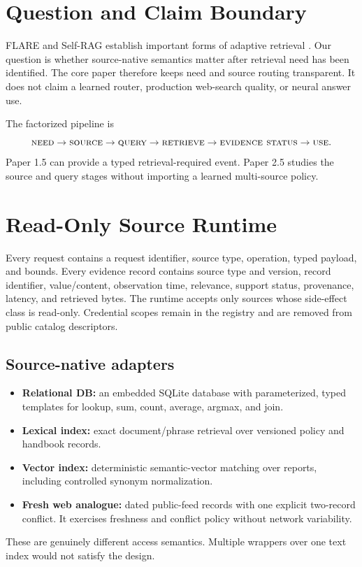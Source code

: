 \documentclass[11pt]{article}
\begin{document}
\section{Question and Claim Boundary}
FLARE and Self-RAG establish important forms of adaptive retrieval
\cite{flare,selfrag}. Our question is whether source-native semantics matter
after retrieval need has been identified. The core paper therefore keeps need
and source routing transparent. It does not claim a learned router, production
web-search quality, or neural answer use.

The factorized pipeline is
\[
\textsc{need}\rightarrow\textsc{source}\rightarrow\textsc{query}
\rightarrow\textsc{retrieve}\rightarrow\textsc{evidence\ status}
\rightarrow\textsc{use}.
\]
Paper 1.5 can provide a typed retrieval-required event. Paper 2.5 studies the
source and query stages without importing a learned multi-source policy.

\section{Read-Only Source Runtime}
Every request contains a request identifier, source type, operation, typed
payload, and bounds. Every evidence record contains source type and version,
record identifier, value/content, observation time, relevance, support status,
provenance, latency, and retrieved bytes. The runtime accepts only sources whose
side-effect class is read-only. Credential scopes remain in the registry and are
removed from public catalog descriptors.

\subsection{Source-native adapters}
\begin{itemize}
\item \textbf{Relational DB:} an embedded SQLite database with parameterized,
typed templates for lookup, sum, count, average, argmax, and join.
\item \textbf{Lexical index:} exact document/phrase retrieval over versioned
policy and handbook records.
\item \textbf{Vector index:} deterministic semantic-vector matching over reports,
including controlled synonym normalization.
\item \textbf{Fresh web analogue:} dated public-feed records with one explicit
two-record conflict. It exercises freshness and conflict policy without network
variability.
\end{itemize}
These are genuinely different access semantics. Multiple wrappers over one text
index would not satisfy the design.
\end{document}
